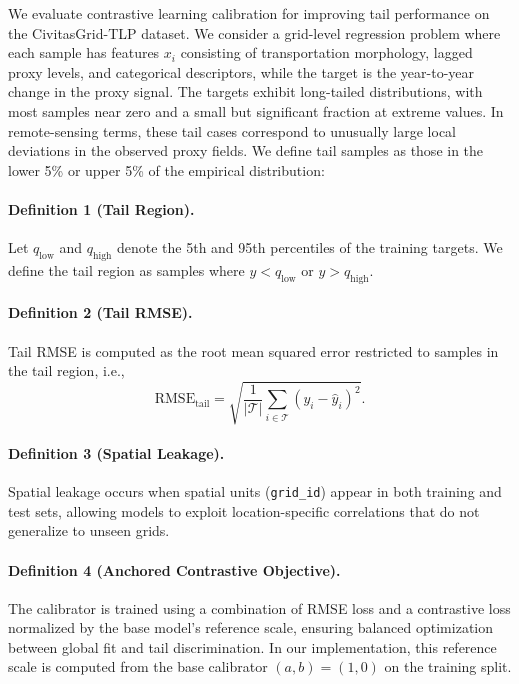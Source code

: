 \documentclass[preprint,12pt]{elsarticle}
\begin{document}
We evaluate contrastive learning calibration for improving tail performance on the CivitasGrid-TLP dataset. We consider a grid-level regression problem where each sample has features $x_i$ consisting of transportation morphology, lagged proxy levels, and categorical descriptors, while the target is the year-to-year change in the proxy signal. The targets exhibit long-tailed distributions, with most samples near zero and a small but significant fraction at extreme values. In remote-sensing terms, these tail cases correspond to unusually large local deviations in the observed proxy fields. We define tail samples as those in the lower 5\% or upper 5\% of the empirical distribution:

\paragraph{Definition 1 (Tail Region).}
Let $q_{\mathrm{low}}$ and $q_{\mathrm{high}}$ denote the 5th and 95th percentiles of the training targets. We define the tail region as samples where $y < q_{\mathrm{low}}$ or $y > q_{\mathrm{high}}$.

\paragraph{Definition 2 (Tail RMSE).}
Tail RMSE is computed as the root mean squared error restricted to samples in the tail region, i.e.,
\begin{equation}
\mathrm{RMSE}_{\mathrm{tail}}=\sqrt{\frac{1}{|\mathcal{T}|}\sum_{i\in\mathcal{T}}(y_i-\hat{y}_i)^2}.
\end{equation}

\paragraph{Definition 3 (Spatial Leakage).}
Spatial leakage occurs when spatial units (\texttt{grid\_id}) appear in both training and test sets, allowing models to exploit location-specific correlations that do not generalize to unseen grids.

\paragraph{Definition 4 (Anchored Contrastive Objective).}
The calibrator is trained using a combination of RMSE loss and a contrastive loss normalized by the base model's reference scale, ensuring balanced optimization between global fit and tail discrimination. In our implementation, this reference scale is computed from the base calibrator $(a,b)=(1,0)$ on the training split.
\end{document}
